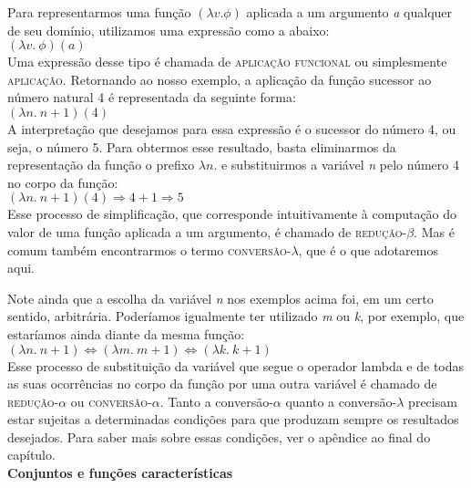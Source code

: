 Para representarmos uma função $(\lambda v. \phi)$
aplicada a um argumento \textit{a}
qualquer de seu domínio, utilizamos uma expressão como a abaixo:\\

\n $(\lambda v.\ \phi)(a)$\\

\n Uma expressão desse tipo é chamada de \textsc{aplicação
funcional} ou simplesmente \textsc{aplicação}. Retornando ao
nosso exemplo, a aplicação da função sucessor ao número
natural 4 é
representada da seguinte forma:\\

\n $(\lambda n.\ n + 1)(4)$\\

\n A interpretação que desejamos para essa expressão é o
sucessor do número 4, ou seja, o número 5. Para obtermos esse
resultado, basta eliminarmos da representação da função o
prefixo $\lambda n.$ e substituirmos a variável \textit{n} pelo
número
4 no corpo da função:\\

\n $(\lambda n.\ n + 1)(4) \Rightarrow 4 + 1 \Rightarrow 5$\\

\n Esse processo de simplificação, que corresponde
intuitivamente à computação do valor de uma função aplicada a
um argumento, é chamado de \textsc{redução}-$\beta$. Mas é comum
também encontrarmos o termo \textsc{conversão}-$\lambda$, que é o
que adotaremos aqui.

Note ainda que a
escolha da variável \textit{n} nos exemplos acima foi, em um certo
sentido, arbitrária. Poderíamos igualmente ter utilizado \textit{m}
ou \textit{k}, por exemplo, que estaríamos ainda diante da mesma
função:\\

\n $(\lambda n.\ n + 1) \Leftrightarrow (\lambda m.\ m + 1)
\Leftrightarrow (\lambda k.\ k + 1)$\\

\n Esse processo de substituição da variável que segue o
operador lambda e de todas as suas ocorrências no corpo da
função por uma outra variável é chamado de
\textsc{redução}-$\alpha$ ou \textsc{conversão}-$\alpha$. Tanto a conversão-$\alpha$ quanto a conversão-$\lambda$ precisam estar sujeitas a determinadas condições para que produzam sempre os resultados desejados. Para saber mais sobre essas condições, ver o apêndice ao final do capítulo.\\

\n \textbf{Conjuntos e funções características}\\

